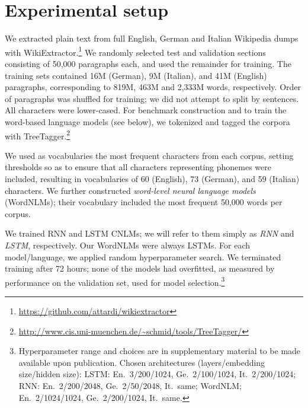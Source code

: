 \section{Experimental setup}
\label{sec:setup}

We extracted plain text from full English, German and Italian
Wikipedia dumps with
WikiExtractor.\footnote{\url{https://github.com/attardi/wikiextractor}}
We randomly selected test and validation sections consisting of 50,000
paragraphs each, and used the remainder for training. The training
sets contained 16M (German), 9M (Italian), and 41M (English)
paragraphs, corresponding to 819M, 463M and 2,333M words,
respectively. Order of paragraphs was shuffled for training; we did
not attempt to split by sentences. All characters were lower-cased.
For benchmark construction and to train the word-based language models
(see below), we tokenized and tagged the corpora with
TreeTagger.\footnote{\url{http://www.cis.uni-muenchen.de/~schmid/tools/TreeTagger/}}

We used as vocabularies the most frequent characters from
each corpus, setting thresholds so as to ensure that all characters
representing phonemes were included, resulting in vocabularies of 60 (English), 73 (German), and 59 (Italian) characters.
We further constructed \emph{word-level neural language models} (WordNLMs); 
their vocabulary included the most frequent 50,000 words per corpus.

We trained RNN and LSTM CNLMs; we will refer to them simply as
\emph{RNN} and \emph{LSTM}, respectively. Our
WordNLMs were always LSTMs.  For each model/language, we applied random
hyperparameter search.  We terminated training after 72 hours; none of
the models had overfitted, as measured by performance on the
validation set, used for model selection.\footnote{Hyperparameter range and choices are in supplementary material to be made
  available upon publication. Chosen architectures (layers/embedding size/hidden size): LSTM: En.~3/200/1024, Ge.~2/100/1024, It.~2/200/1024; RNN: En.~2/200/2048, Ge.~2/50/2048, It.~same; WordNLM; En.~2/1024/1024, Ge.~2/200/1024, It.~same.}

